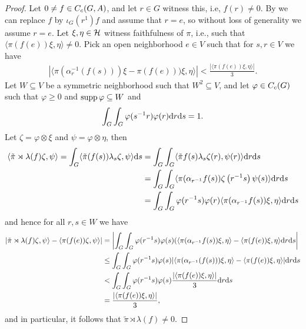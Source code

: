 \begin{proof}
	Let $0 \neq f \in C_c(G,A)$, and let $r \in G$ witness this, i.e, $f(r) \neq 0$. By  we can replace $f$ by $\iota_G(r^{1})f$ and assume that $r=e$, so without loss of generality we assume $r = e$. Let $\xi, \eta \in \mathcal{H}$ witness faithfulness of $\pi$, i.e., such that $\langle \pi ( f(e)) \xi, \eta \rangle \neq 0$. Pick an open neighborhood $e \in V$ such that for $s,r \in V$ we have 
	\begin{align*}
		| \langle \pi(\alpha_r^{-1}(f(s))) \xi  - \pi(f(e)))\xi , \eta \rangle|  < \frac{| \langle \pi (f(e)) \xi , \eta\rangle|}{3}.
	\end{align*}
Let $W \subseteq V$ be a symmetric neighborhood such that $W^2 \subseteq V$, and let $\varphi \in C_c(G)$ such that $\varphi \geq 0$ and $\operatorname{supp} \varphi \subseteq W$ and
\begin{align*}
	\int_G \int_G \varphi(s^{-1}r) \varphi(r) \mathrm{d} r \mathrm{d} s = 1.
\end{align*}
Let $\zeta = \varphi \otimes \xi$ and $\psi = \varphi \otimes \eta$, then
\begin{align*}
	\langle \tilde{ \pi } \rtimes \lambda (f) \zeta, \psi \rangle  =  \int_G \langle \tilde{\pi}(f(s)) \lambda_s \zeta , \psi\rangle \mathrm{d} s &= \int_G \int_G \langle \tilde{\pi} f(s) \lambda_s \zeta(r) , \psi(r) \rangle \mathrm{d} r \mathrm{d} s\\
	&= \int_G \int_G \langle \pi(\alpha_{r^{-1}}f(s)) \zeta\left( r^{-1}s \right) \psi(s) \rangle \mathrm{d} r \mathrm{d} s\\
	&= \int_G \int_G \varphi(r^{-1}s) \varphi(r) \langle \pi(\alpha_{r^{-1}}f(s)) \xi , \eta \rangle \mathrm{d} r \mathrm{d} s
\end{align*}
and hence for all $r,s \in W$ we have
\begin{align*}
	\left | \tilde{\pi} \rtimes \lambda (f) \zeta , \psi \rangle - \langle \pi(f(e)) \zeta , \psi \rangle\right | &=  \left |  \int_G \int_G\varphi(r^{-1}s) \varphi (s) (\langle \pi(\alpha_{r^{-1}} f(s)) \xi , \eta \rangle - \langle \pi(f(e)) \xi , \eta \rangle  \mathrm{d} r \mathrm{d} s \right | \\
	&\leq \int_G \int_G \varphi(r^{-1}s ) \varphi (s) | \langle \pi(\alpha_{r^{-1}}(f(s))) \xi , \eta\rangle - \langle \pi(f(e)) \xi , \eta \rangle | \mathrm{d} r \mathrm{d} s \\
	&< \int_G \int_G \varphi(r^{-1}s) \varphi(s) \frac{| \langle \pi(f(e)) \xi, \eta \rangle|}{3} \mathrm{d} r \mathrm{d} s \\
	&= \frac{| \langle \pi(f(e)) \xi , \eta \rangle|} {3},
\end{align*}
and in particular, it follows that $\tilde{\pi} \rtimes \lambda (f) \neq 0$.
\end{proof}

